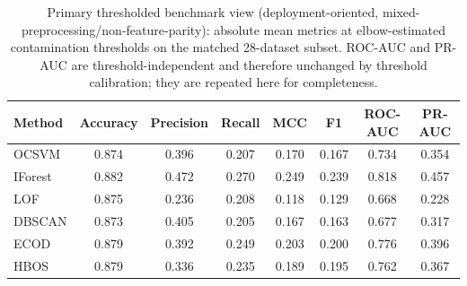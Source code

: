 \documentclass[cameraready]{Interspeech}
\begin{document}
\begin{table}[!ht]
\centering
\caption{Primary thresholded benchmark view (deployment-oriented, mixed-preprocessing/non-feature-parity): absolute mean metrics at elbow-estimated contamination thresholds on the matched 28-dataset subset. ROC-AUC and PR-AUC are threshold-independent and therefore unchanged by threshold calibration; they are repeated here for completeness.}
\label{tab:metrics-estimated-absolute}
\small
\setlength{\tabcolsep}{5pt}
\begin{tabular}{l
                S[table-format=1.3]
                S[table-format=1.3]
                S[table-format=1.3]
                S[table-format=1.3]
                S[table-format=1.3]
                S[table-format=1.3]
                S[table-format=1.3]}
\toprule
\textbf{Method} & \textbf{Accuracy} & \textbf{Precision} & \textbf{Recall} & \textbf{MCC} & \textbf{F1} & \textbf{ROC-AUC} & \textbf{PR-AUC} \\
\midrule
OCSVM   & \num{0.874} & \num{0.396} & \num{0.207} & \num{0.170} & \num{0.167} & \num{0.734} & \num{0.354} \\
IForest & \num{0.882} & \num{0.472} & \num{0.270} & \num{0.249} & \num{0.239} & \num{0.818} & \num{0.457} \\
LOF     & \num{0.875} & \num{0.236} & \num{0.208} & \num{0.118} & \num{0.129} & \num{0.668} & \num{0.228} \\
DBSCAN  & \num{0.873} & \num{0.405} & \num{0.205} & \num{0.167} & \num{0.163} & \num{0.677} & \num{0.317} \\
ECOD    & \num{0.879} & \num{0.392} & \num{0.249} & \num{0.203} & \num{0.200} & \num{0.776} & \num{0.396} \\
HBOS    & \num{0.879} & \num{0.336} & \num{0.235} & \num{0.189} & \num{0.195} & \num{0.762} & \num{0.367} \\
\bottomrule
\end{tabular}
\end{table}
\end{document}
